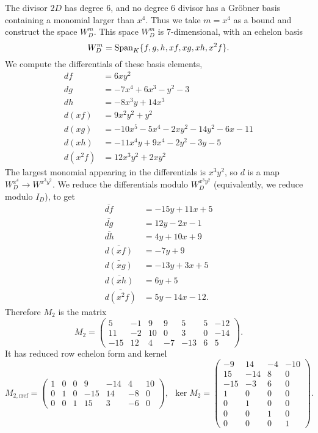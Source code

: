 The divisor $2D$ has degree 6, and no degree 6 divisor has a Gr\"obner basis containing a monomial larger than $x^4$.
Thus we take $m = x^4$ as a bound and construct the space $W_D^m$.
This space $W_D^m$ is 7-dimensional, with an echelon basis
\[ W_D^m = \operatorname{Span}_K\{ f, g, h, xf, xg, xh, x^2f \}. \]
We compute the differentials of these basis elements,
\begin{align*}
  df      &= 6xy^2 \\
  dg      &= -7x^4 + 6x^3 - y^2 - 3 \\
  dh      &= -8x^3y + 14x^3 \\
  d(xf)   &= 9x^2y^2 + y^2 \\
  d(xg)   &= -10x^5 - 5x^4 - 2xy^2 - 14y^2 - 6x - 11 \\
  d(xh)   &= -11x^4y + 9x^4 - 2y^2 - 3y - 5 \\
  d(x^2f) &= 12x^3y^2 + 2xy^2
\end{align*}
The largest monomial appearing in the differentials is $x^3y^2$, so $d$ is a map $W_D^{x^4} \to W^{x^3y^2}$.
We reduce the differentials modulo $W_D^{x^3y^2}$ (equivalently, we reduce modulo $I_D$), to get
\begin{align*}
  \bar{df}      &= -15y + 11x + 5 \\
  \bar{dg}      &= 12y - 2x - 1 \\
  \bar{dh}      &= 4y + 10x + 9 \\
  \bar{d(xf)}   &= -7y + 9 \\
  \bar{d(xg)}   &= -13y + 3x + 5 \\
  \bar{d(xh)}   &= 6y + 5 \\
  \bar{d(x^2f)} &= 5y - 14x - 12.
\end{align*}
Therefore $M_2$ is the matrix
\[ M_2 = \begin{pmatrix}
  5 & -1 & 9 & 9 & 5 & 5 & -12 \\
  11 & -2 & 10 & 0 & 3 & 0 & -14 \\
  -15 & 12 & 4 & -7 & -13 & 6 & 5
\end{pmatrix}. \]
It has reduced row echelon form and kernel
\[ M_{2,\text{rref}} = \begin{pmatrix}
  1 & 0 & 0 &   9 & -14 &  4 & 10 \\
  0 & 1 & 0 & -15 &  14 & -8 &  0 \\
  0 & 0 & 1 &  15 &   3 & -6 &  0
\end{pmatrix}, ~~
\ker M_2 = \begin{pmatrix}
   -9 &  14 & -4 & -10 \\
   15 & -14 &  8 &   0 \\
  -15 &  -3 &  6 &   0 \\
    1 &   0 &  0 &   0 \\
    0 &   1 &  0 &   0 \\
    0 &   0 &  1 &   0 \\
    0 &   0 &  0 &   1
\end{pmatrix}. \]
